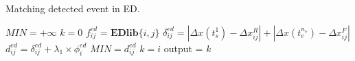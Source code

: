 \begin{algorithm}
\caption{Matching detected event in ED.}\label{algo:ED1}
\begin{algorithmic}[1]
\State $MIN = +\infty$
\State $k = 0$
		    \State $f_{ij}^{ed} = \mathbf{EDlib}\{i,j\}$
		    \State $\delta_{ij}^{ed} = |\Delta x(t_s^1)-\Delta x_{ij}^R|+|\Delta x(t_e^{n_e})-\Delta x_{ij}^F|$
		    \State $d_{ij}^{ed} = \delta_{ij}^{ed}+\lambda_1\times \phi_i^{ed}$
		        \State $MIN = d_{ij}^{ed}$
		        \State $k = i$
		    \EndIf
		 \EndFor
	\EndFor
\State output = $k$
\EndFunction
\end{algorithmic}
\end{algorithm}

